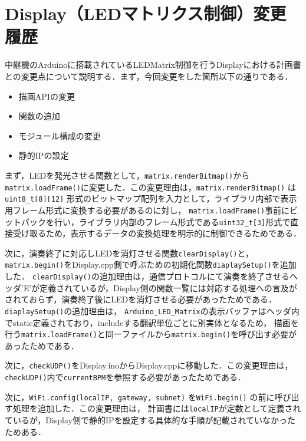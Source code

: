 \documentclass[uplatex,dvipdfmx,a4paper,11pt]{jsarticle}
\begin{document}
\section{Display（LEDマトリクス制御）変更履歴}

中継機のArduinoに搭載されているLEDMatrix制御を行うDisplayにおける計画書との変更点について説明する．まず，今回変更をした箇所以下の通りである．

\begin{itemize}
\item 描画APIの変更
\item 関数の追加
\item モジュール構成の変更
\item 静的IPの設定
\end{itemize}

まず，LEDを発光させる関数として，\texttt{matrix.renderBitmap()}から\texttt{matrix.loadFrame()}に変更した．この変更理由は，\texttt{matrix.renderBitmap()} は\texttt{uint8\_t[8][12]} 形式のビットマップ配列を入力として，ライブラリ内部で表示用フレーム形式に変換する必要があるのに対し，
\texttt{matrix.loadFrame()}事前にビットパックを行い，ライブラリ内部のフレーム形式である\texttt{uint32\_t[3]}形式で直接受け取るため，表示するデータの変換処理を明示的に制御できるためである．\par

次に，演奏終了に対応しLEDを消灯させる関数\texttt{clearDisplay()}と，\texttt{matrix.begin()}をDisplay.cpp側で呼ぶための初期化関数\texttt{diaplaySetup()}を追加した．
\texttt{clearDisplay()}の追加理由は，通信プロトコルにて演奏を終了させるヘッダ'E'が定義されているが，Display側の関数一覧には対応する処理への言及がされておらず，演奏終了後にLEDを消灯させる必要があったためである．
\texttt{diaplaySetup()}の追加理由は， \texttt{Arduino\_LED\_Matrix}の表示バッファはヘッダ内でstatic定義されており，includeする翻訳単位ごとに別実体となるため，
描画を行う\texttt{matrix.loadFrame()}と同一ファイルから\texttt{matrix.begin()}を呼び出す必要があったためである．\par
次に，\texttt{checkUDP()}をDisplay.inoからDisplay.cppに移動した．この変更理由は，\texttt{checkUDP()}内で\texttt{currentBPM}を参照する必要があったためである．\par
次に，\texttt{WiFi.config(localIP, gateway, subnet)} を\texttt{WiFi.begin()} の前に呼び出す処理を追加した．この変更理由は，
計画書には\texttt{localIP}が定数として定義されているが，Display側で静的IPを設定する具体的な手順が記載されていなかったためある．





 
\end{document}
